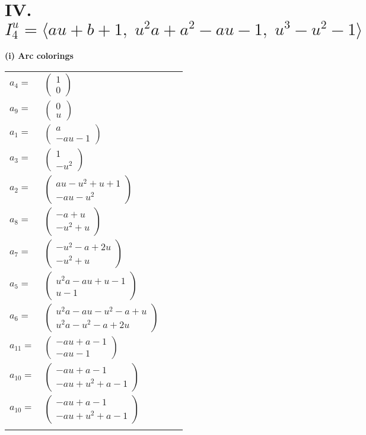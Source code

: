 \documentclass[1p]{elsarticle_modified}
\theoremstyle{definition}
\begin{document}
\centering \section*{IV. $I^u_{4}= \langle a u+b+1,\;u^2 a+a^2- a u-1,\;u^3- u^2-1 \rangle$}
\flushleft \textbf{(i) Arc colorings}\\
\begin{tabular}{m{7pt} m{180pt} m{7pt} m{180pt} }
\flushright $a_{4}=$&$\begin{pmatrix}1\\0\end{pmatrix}$ \\
\flushright $a_{9}=$&$\begin{pmatrix}0\\u\end{pmatrix}$ \\
\flushright $a_{1}=$&$\begin{pmatrix}a\\- a u-1\end{pmatrix}$ \\
\flushright $a_{3}=$&$\begin{pmatrix}1\\- u^2\end{pmatrix}$ \\
\flushright $a_{2}=$&$\begin{pmatrix}a u- u^2+u+1\\- a u- u^2\end{pmatrix}$ \\
\flushright $a_{8}=$&$\begin{pmatrix}- a+u\\- u^2+u\end{pmatrix}$ \\
\flushright $a_{7}=$&$\begin{pmatrix}- u^2- a+2 u\\- u^2+u\end{pmatrix}$ \\
\flushright $a_{5}=$&$\begin{pmatrix}u^2 a- a u+u-1\\u-1\end{pmatrix}$ \\
\flushright $a_{6}=$&$\begin{pmatrix}u^2 a- a u- u^2- a+u\\u^2 a- u^2- a+2 u\end{pmatrix}$ \\
\flushright $a_{11}=$&$\begin{pmatrix}- a u+a-1\\- a u-1\end{pmatrix}$ \\
\flushright $a_{10}=$&$\begin{pmatrix}- a u+a-1\\- a u+u^2+a-1\end{pmatrix}$\\ \flushright $a_{10}=$&$\begin{pmatrix}- a u+a-1\\- a u+u^2+a-1\end{pmatrix}$\\&\end{tabular}
\end{document}
